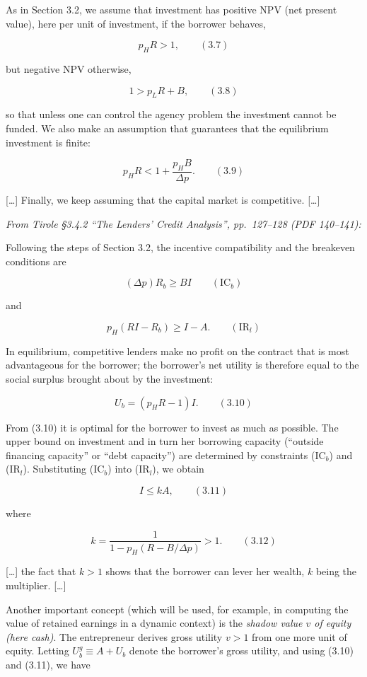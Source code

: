 \documentclass[11pt,a4paper]{article}
\begin{document}
As in Section 3.2, we assume that investment has positive NPV (net present value), here per unit of
investment, if the borrower behaves,

\[p_H R > 1, \qquad (3.7)\]

but negative NPV otherwise,

\[1 > p_L R + B, \qquad (3.8)\]

so that unless one can control the agency problem the investment cannot be funded. We also make an
assumption that guarantees that the equilibrium investment is finite:

\[p_H R < 1 + \frac{p_H B}{\Delta p}. \qquad (3.9)\]

{[}\ldots{]} Finally, we keep assuming that the capital market is competitive. {[}\ldots{]}

\emph{From Tirole §3.4.2 ``The Lenders' Credit Analysis'', pp.~127--128 (PDF 140--141):}

Following the steps of Section 3.2, the incentive compatibility and the breakeven conditions are

\[(\Delta p) R_b \geqslant BI \qquad (\text{IC}_b)\]

and

\[p_H(RI - R_b) \geqslant I - A. \qquad (\text{IR}_l)\]

In equilibrium, competitive lenders make no profit on the contract that is most advantageous for the
borrower; the borrower's net utility is therefore equal to the social surplus brought about by the
investment:

\[U_b = (p_H R - 1) I. \qquad (3.10)\]

From (3.10) it is optimal for the borrower to invest as much as possible. The upper bound on
investment and in turn her borrowing capacity (``outside financing capacity'' or ``debt capacity'')
are determined by constraints (IC\(_b\)) and (IR\(_l\)). Substituting (IC\(_b\)) into (IR\(_l\)), we
obtain

\[I \leqslant kA, \qquad (3.11)\]

where

\[k = \frac{1}{1 - p_H(R - B/\Delta p)} > 1. \qquad (3.12)\]

{[}\ldots{]} the fact that \(k > 1\) shows that the borrower can lever her wealth, \(k\) being the
multiplier. {[}\ldots{]}

Another important concept (which will be used, for example, in computing the value of retained
earnings in a dynamic context) is the \emph{shadow value \(v\) of equity (here cash)}. The
entrepreneur derives gross utility \(v > 1\) from one more unit of equity. Letting
\(U_b^g \equiv A + U_b\) denote the borrower's gross utility, and using (3.10) and (3.11), we have
\end{document}
